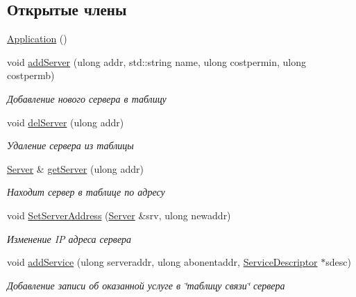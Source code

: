 \subsection*{Открытые члены}
\begin{DoxyCompactItemize}
\item 
\hyperlink{class_network_service_1_1_application_afa8cc05ce6b6092be5ecdfdae44e05f8}{Application} ()
\item 
void \hyperlink{class_network_service_1_1_application_a7c718890bcaa6cce31f29c1ae7e69b81}{add\+Server} (ulong addr, std\+::string name, ulong costpermin, ulong costpermb)
\begin{DoxyCompactList}\small\item\em Добавление нового сервера в таблицу \end{DoxyCompactList}\item 
void \hyperlink{class_network_service_1_1_application_ad09e462bffd3345934a1e3f3eca89774}{del\+Server} (ulong addr)
\begin{DoxyCompactList}\small\item\em Удаление сервера из таблицы \end{DoxyCompactList}\item 
\hyperlink{class_network_service_1_1_server}{Server} \& \hyperlink{class_network_service_1_1_application_acb73429fd01baca7eb138c316f05c97a}{get\+Server} (ulong addr)
\begin{DoxyCompactList}\small\item\em Находит сервер в таблице по адресу \end{DoxyCompactList}\item 
void \hyperlink{class_network_service_1_1_application_a7b18fb99b391286a0cf85c3c731b5982}{Set\+Server\+Address} (\hyperlink{class_network_service_1_1_server}{Server} \&srv, ulong newaddr)
\begin{DoxyCompactList}\small\item\em Изменение I\+P адреса сервера \end{DoxyCompactList}\item 
void \hyperlink{class_network_service_1_1_application_a31f7383eb1d003932ca6d3111571ef2e}{add\+Service} (ulong serveraddr, ulong abonentaddr, \hyperlink{class_network_service_1_1_service_descriptor}{Service\+Descriptor} $\ast$sdesc)
\begin{DoxyCompactList}\small\item\em Добавление записи об оказанной услуге в \char`\"{}таблицу связи\char`\"{} сервера \end{DoxyCompactList}\item 

\end{DoxyCompactItemize}
